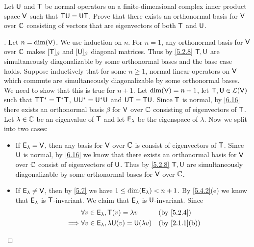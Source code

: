 \begin{ex}\label{ex:6.6.10}
  Let \(\mathsf{U}\) and \(\mathsf{T}\) be normal operators on a finite-dimensional complex inner product space \(\mathsf{V}\) such that \(\mathsf{T} \mathsf{U} = \mathsf{U} \mathsf{T}\).
  Prove that there exists an orthonormal basis for \(\mathsf{V}\) over \(\mathbb{C}\) consisting of vectors that are eigenvectors of both \(\mathsf{T}\) and \(\mathsf{U}\).
\end{ex}

\begin{proof}[]
  Let \(n = \dim(\mathsf{V})\).
  We use induction on \(n\).
  For \(n = 1\), any orthonormal basis for \(\mathsf{V}\) over \(\mathbb{C}\) makes \([\mathsf{T}]_{\beta}\) and \([\mathsf{U}]_{\beta}\) diagonal matrices.
  Thus by \cref{5.2.8} \(\mathsf{T}, \mathsf{U}\) are simultaneously diagonalizable by some orthonormal bases and the base case holds.
  Suppose inductively that for some \(n \geq 1\), normal linear operators on \(\mathsf{V}\) which commute are simultaneously diagonalizable by some orthonormal bases.
  We need to show that this is true for \(n + 1\).
  Let \(\dim(\mathsf{V}) = n + 1\), let \(\mathsf{T}, \mathsf{U} \in \mathcal{L}(\mathsf{V})\) such that \(\mathsf{T} \mathsf{T}^* = \mathsf{T}^* \mathsf{T}\), \(\mathsf{U} \mathsf{U}^* = \mathsf{U}^* \mathsf{U}\) and \(\mathsf{U} \mathsf{T} = \mathsf{T} \mathsf{U}\).
  Since \(\mathsf{T}\) is normal, by \cref{6.16} there exists an orthonormal basis \(\beta\) for \(\mathsf{V}\) over \(\mathbb{C}\) consisting of eigenvectors of \(\mathsf{T}\).
  Let \(\lambda \in \mathbb{C}\) be an eigenvalue of \(\mathsf{T}\) and let \(\mathsf{E}_{\lambda}\) be the eigenspace of \(\lambda\).
  Now we split into two cases:
  \begin{itemize}
    \item If \(\mathsf{E}_{\lambda} = \mathsf{V}\), then any basis for \(\mathsf{V}\) over \(\mathbb{C}\) is consist of eigenvectors of \(\mathsf{T}\).
          Since \(\mathsf{U}\) is normal, by \cref{6.16} we know that there exists an orthonormal basis for \(\mathsf{V}\) over \(\mathbb{C}\) consist of eigenvectors of \(\mathsf{U}\).
          Thus by \cref{5.2.8} \(\mathsf{T}, \mathsf{U}\) are simultaneously diagonalizable by some orthonormal bases for \(\mathsf{V}\) over \(\mathbb{C}\).
    \item If \(\mathsf{E}_{\lambda} \neq \mathsf{V}\), then by \cref{5.7} we have \(1 \leq \dim(\mathsf{E}_{\lambda}) < n + 1\).
          By \cref{5.4.2}(e) we know that \(\mathsf{E}_{\lambda}\) is \(\mathsf{T}\)-invariant.
          We claim that \(\mathsf{E}_{\lambda}\) is \(\mathsf{U}\)-invariant.
          Since
          \begin{align*}
                     & \forall v \in \vs{E}_{\lambda}, \T(v) = \lambda v             &  & \by{5.2.4}    \\
            \implies & \forall v \in \vs{E}_{\lambda}, \lambda \U(v) = \U(\lambda v) &  & \by{2.1.1}[b] \\

\end{align*}
\end{itemize}
\end{proof}
